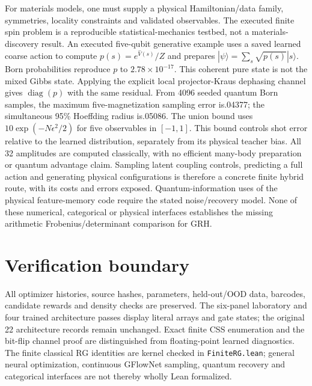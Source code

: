 For materials models, one must supply a physical Hamiltonian/data family,
symmetries, locality constraints and validated observables. The executed
finite spin problem is a reproducible statistical-mechanics testbed, not a
materials-discovery result. An executed five-qubit generative example uses a saved learned coarse
action to compute $ p(s)=e^{\widehat V(s)}/Z $ and prepares
$|\psi\rangle=\sum_s\sqrt{p(s)}|s\rangle $. Born probabilities reproduce
$ p $ to $2.78\times 10^{-17}$. This coherent pure state is not the mixed Gibbs
state. Applying the explicit local projector-Kraus dephasing channel gives
$\operatorname{diag}(p)$ with the same residual. From 4096 seeded quantum
Born samples, the maximum five-magnetization sampling error is.04377; the
simultaneous 95\% Hoeffding radius is.05086. The union bound uses
$10\exp(-N\epsilon^2/2)$ for five observables in $[-1,1]$. This bound controls
shot error relative to the learned distribution, separately from its physical
teacher bias. All 32 amplitudes are computed classically, with no efficient
many-body preparation or quantum advantage claim. Sampling latent coupling
controls, predicting a full action and generating physical configurations is
therefore a concrete finite hybrid route, with its costs and errors exposed. Quantum-information uses of the physical feature-memory
code require the stated noise/recovery model. None of these numerical,
categorical or physical interfaces establishes the missing arithmetic
Frobenius/determinant comparison for GRH.

\section{Verification boundary}
All optimizer histories, source hashes, parameters, held-out/OOD data,
barcodes, candidate rewards and density checks are preserved. The six-panel
laboratory and four trained architecture passes display literal arrays and
gate states; the original 22 architecture records remain unchanged. Exact
finite CSS enumeration and the bit-flip channel proof are distinguished
from floating-point learned diagnostics. The finite classical RG identities
are kernel checked in \texttt{FiniteRG.lean}; general neural optimization,
continuous GFlowNet sampling, quantum recovery and categorical interfaces
are not thereby wholly Lean formalized.
